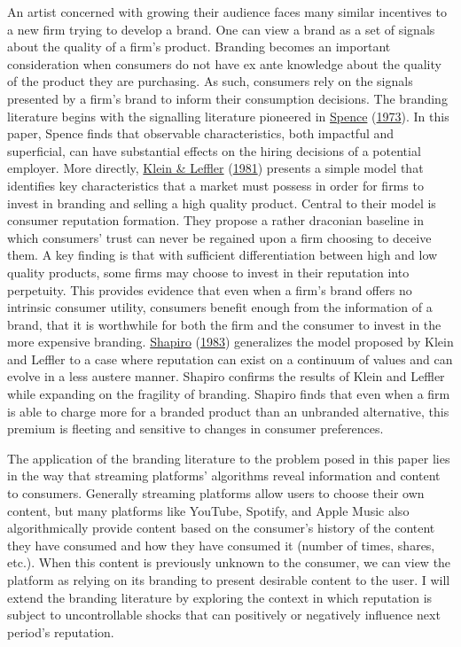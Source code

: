 \documentclass[
]{article}
\begin{document}
An artist concerned with growing their audience faces many similar
incentives to a new firm trying to develop a brand. One can view a brand
as a set of signals about the quality of a firm's product. Branding
becomes an important consideration when consumers do not have ex ante
knowledge about the quality of the product they are purchasing. As such,
consumers rely on the signals presented by a firm's brand to inform
their consumption decisions. The branding literature begins with the
signalling literature pioneered in
\protect\hyperlink{ref-spenceJobMarketSignaling1973}{Spence}
(\protect\hyperlink{ref-spenceJobMarketSignaling1973}{1973}). In this
paper, Spence finds that observable characteristics, both impactful and
superficial, can have substantial effects on the hiring decisions of a
potential employer. More directly,
\protect\hyperlink{ref-kleinRoleMarketForces1981}{Klein \& Leffler}
(\protect\hyperlink{ref-kleinRoleMarketForces1981}{1981}) presents a
simple model that identifies key characteristics that a market must
possess in order for firms to invest in branding and selling a high
quality product. Central to their model is consumer reputation
formation. They propose a rather draconian baseline in which consumers'
trust can never be regained upon a firm choosing to deceive them. A key
finding is that with sufficient differentiation between high and low
quality products, some firms may choose to invest in their reputation
into perpetuity. This provides evidence that even when a firm's brand
offers no intrinsic consumer utility, consumers benefit enough from the
information of a brand, that it is worthwhile for both the firm and the
consumer to invest in the more expensive branding.
\protect\hyperlink{ref-shapiroPremiumsHighQuality1983}{Shapiro}
(\protect\hyperlink{ref-shapiroPremiumsHighQuality1983}{1983})
generalizes the model proposed by Klein and Leffler to a case where
reputation can exist on a continuum of values and can evolve in a less
austere manner. Shapiro confirms the results of Klein and Leffler while
expanding on the fragility of branding. Shapiro finds that even when a
firm is able to charge more for a branded product than an unbranded
alternative, this premium is fleeting and sensitive to changes in
consumer preferences.

The application of the branding literature to the problem posed in this
paper lies in the way that streaming platforms' algorithms reveal
information and content to consumers. Generally streaming platforms
allow users to choose their own content, but many platforms like
YouTube, Spotify, and Apple Music also algorithmically provide content
based on the consumer's history of the content they have consumed and
how they have consumed it (number of times, shares, etc.). When this
content is previously unknown to the consumer, we can view the platform
as relying on its branding to present desirable content to the user. I
will extend the branding literature by exploring the context in which
reputation is subject to uncontrollable shocks that can positively or
negatively influence next period's reputation.
\end{document}
